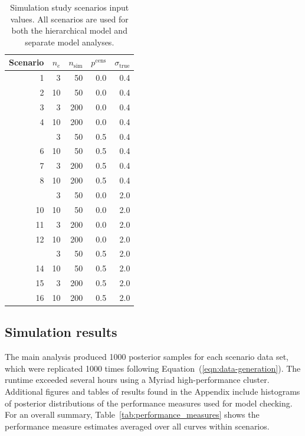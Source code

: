 \documentclass[AMA,STIX1COL]{WileyNJD-v2}
\begin{document}
\begin{table}[h!]
\centering
\begin{tabular}{rrrrr}
\toprule
Scenario & $n_e$ & $n_{\text{sim}}$ & $p^{\text{cens}}$ & $\sigma_{\text{true}}$\\
\midrule
1 & 3 & 50 & 0.0 & 0.4\\
2 & 10 & 50 & 0.0 & 0.4\\
3 & 3 & 200 & 0.0 & 0.4\\
4 & 10 & 200 & 0.0 & 0.4\\
\addlinespace
5 & 3 & 50 & 0.5 & 0.4\\
6 & 10 & 50 & 0.5 & 0.4\\
7 & 3 & 200 & 0.5 & 0.4\\
8 & 10 & 200 & 0.5 & 0.4\\
\addlinespace
9 & 3 & 50 & 0.0 & 2.0\\
10 & 10 & 50 & 0.0 & 2.0\\
11 & 3 & 200 & 0.0 & 2.0\\
12 & 10 & 200 & 0.0 & 2.0\\
\addlinespace
13 & 3 & 50 & 0.5 & 2.0\\
14 & 10 & 50 & 0.5 & 2.0\\
15 & 3 & 200 & 0.5 & 2.0\\
16 & 10 & 200 & 0.5 & 2.0\\
\bottomrule
\end{tabular}
\caption{Simulation study scenarios input values. All scenarios are used for both the hierarchical model and separate model analyses.}
\label{tab:scenarios}
\end{table}


\subsection{Simulation results}
The main analysis produced 1000 posterior samples for each scenario data set, which were replicated 1000 times following Equation~(\ref{eqn:data-generation}). The runtime exceeded several hours using a Myriad high-performance cluster. Additional figures and tables of results found in the Appendix include histograms of posterior distributions of the performance measures used for model checking.
For an overall summary, Table~\ref{tab:performance_measures} shows the performance measure estimates averaged over all curves within scenarios.

\end{document}
